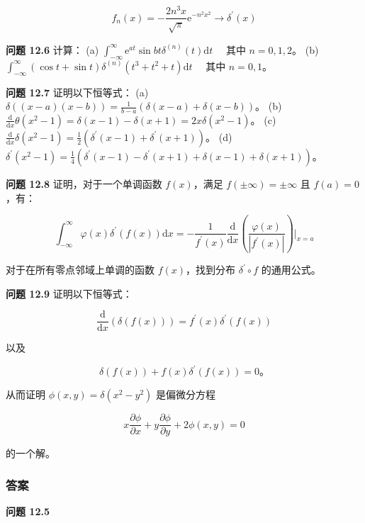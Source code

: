 \[f_{n}(x) = - \frac{2n^{3}x}{\sqrt{\pi}}\mathrm{e}^{- n^{2}x^{2}} \rightarrow \delta^{\prime}(x)\]

\textbf{问题 12.6} 计算： (a)
\(\int_{- \infty}^{\infty}\mathrm{e}^{at}\sin bt\delta^{(n)}(t)\mathrm{d}t\quad\)
其中 \(n = 0,1,2\)。 (b)
\(\int_{- \infty}^{\infty}\left( \cos t + \sin t \right)\delta^{(n)}\left( t^{3} + t^{2} + t \right)\mathrm{d}t\quad\)
其中 \(n = 0,1\)。

\textbf{问题 12.7} 证明以下恒等式： (a)
\(\delta\left( (x - a)(x - b) \right) = \frac{1}{b - a}\left( \delta(x - a) + \delta(x - b) \right)\)。
(b)
\(\frac{\mathrm{d}}{\mathrm{d}x}\theta\left( x^{2} - 1 \right) = \delta(x - 1) - \delta(x + 1) = 2x\delta\left( x^{2} - 1 \right)\)。
(c)
\(\frac{\mathrm{d}}{\mathrm{d}x}\delta\left( x^{2} - 1 \right) = \frac{1}{2}\left( \delta^{\prime}(x - 1) + \delta^{\prime}(x + 1) \right)\)。
(d)
\(\delta^{\prime}\left( x^{2} - 1 \right) = \frac{1}{4}\left( \delta^{\prime}(x - 1) - \delta^{\prime}(x + 1) + \delta(x - 1) + \delta(x + 1) \right)\)。

\textbf{问题 12.8} 证明，对于一个单调函数 \(f(x)\)，满足
\(f( \pm \infty) = \pm \infty\) 且 \(f(a) = 0\)，有：

\[\int_{- \infty}^{\infty}\varphi(x)\delta^{\prime}\left( f(x) \right)\mathrm{d}x = - \frac{1}{f^{\prime}(x)}\frac{\mathrm{d}}{\mathrm{d}x}\left( \frac{\varphi(x)}{\left| f^{\prime}(x) \right|} \right)|_{x = a}\]

对于在所有零点邻域上单调的函数 \(f(x)\)，找到分布
\(\delta^{\prime} \circ f\) 的通用公式。

\textbf{问题 12.9} 证明以下恒等式：

\[\frac{\mathrm{d}}{\mathrm{d}x}\left( \delta\left( f(x) \right) \right) = f^{\prime}(x)\delta^{\prime}\left( f(x) \right)\]

以及

\[\delta\left( f(x) \right) + f(x)\delta^{\prime}\left( f(x) \right) = 0。\]

从而证明 \(\phi(x,y) = \delta\left( x^{2} - y^{2} \right)\) 是偏微分方程

\[x\frac{\partial\phi}{\partial x} + y\frac{\partial\phi}{\partial y} + 2\phi(x,y) = 0\]

的一个解。

\subsubsection{答案}\label{ux7b54ux6848}

\textbf{问题 12.5}

